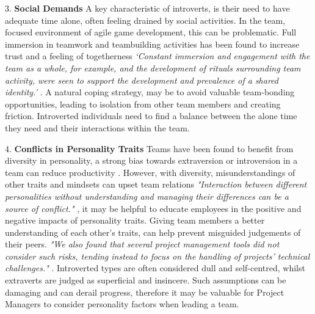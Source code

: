 \documentclass{scrartcl}
\begin{document}
3.	\textbf{Social Demands} \newline
A key characteristic of introverts, is their need to have adequate time alone, often feeling drained by social activities. In the team, focused environment of agile game development, this can be problematic. Full immersion in teamwork and teambuilding activities has been found to increase trust and a feeling of togetherness \textit{`Constant immersion and engagement with the team as a whole, for example, and the development of rituals surrounding team activity, were seen to support the development and prevalence of a shared identity.'} \cite[p. 8]{WhitworthBiddle}. A natural coping strategy, may be to avoid valuable team-bonding opportunities, leading to isolation from other team members and creating friction. Introverted individuals need to find a balance between the alone time they need and their interactions within the team.

4.	\textbf{Conflicts in Personality Traits} \newline
Teams have been found to benefit from diversity in personality, a strong bias towards extraversion or introversion in a team can reduce productivity \cite{Hoffman}. However, with diversity, misunderstandings of other traits and mindsets can upset team relations \textit{"Interaction between different personalities without understanding and managing their differences can be a source of conflict."} \cite[p. 67]{LicorishPhilpottMacDonell}, it may be helpful to educate employees in the positive and negative impacts of personality traits. Giving team members a better understanding of each other's traits, can help prevent misguided judgements of their peers. \textit{"We also found that several project management tools did not consider such risks, tending instead to focus on the handling of projects' technical challenges."} \cite[p. 72]{LicorishPhilpottMacDonell}. Introverted types are often considered dull and self-centred, whilst extraverts are judged as superficial and insincere. Such assumptions can be damaging and can derail progress, therefore it may be valuable for Project Managers to consider personality factors when leading a team.
\end{document}
